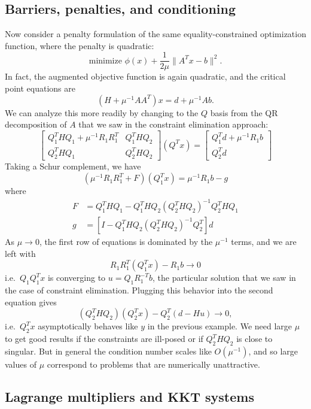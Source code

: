 \documentclass[12pt, leqno]{article} %
\begin{document}
\subsection*{Barriers, penalties, and conditioning}

Now consider a penalty formulation of the same equality-constrained
optimization function, where the penalty is quadratic:
\[
  \mbox{minimize } \phi(x) + \frac{1}{2\mu} \|A^T x-b\|^2.
\]
In fact, the augmented objective function is again quadratic, and
the critical point equations are
\[
  (H + \mu^{-1} AA^T) x = d + \mu^{-1} A b.
\]
We can analyze this more readily by changing to the $Q$ basis from
the QR decomposition of $A$ that we saw in the constraint elimination
approach:
\[
\begin{bmatrix}
  Q_1^T H Q_1 + \mu^{-1} R_1 R_1^T & Q_1^T H Q_2 \\
  Q_2^T H Q_1 & Q_2^T H Q_2
\end{bmatrix}
(Q^T x) =
\begin{bmatrix}
  Q_1^T d + \mu^{-1} R_1 b \\
  Q_2^T d
\end{bmatrix}
\]
Taking a Schur complement, we have
\[
(\mu^{-1} R_1 R_1^T + F)(Q_1^T x) = \mu^{-1} R_1 b - g
\]
where
\begin{align*}
  F &= Q_1^T H Q_1 - Q_1^T H Q_2 (Q_2^T H Q_2)^{-1} Q_2^T H Q_1 \\
  g &= [I - Q_1^T H Q_2 (Q_2^T H Q_2)^{-1} Q_2^T] d
\end{align*}
As $\mu \rightarrow 0$, the first row of equations is dominated by the
$\mu^{-1}$ terms, and we are left with
\[
  R_1 R_1^T (Q_1^T x) - R_1 b \rightarrow 0
\]
i.e.~$Q_1 Q_1^T x$ is converging to $u = Q_1 R_1^{-T} b$, the
particular solution that we saw in the case of constraint elimination.
Plugging this behavior into the second equation gives
\[
  (Q_2^T H Q_2) (Q_2^T x) - Q_2^T (d-Hu) \rightarrow 0,
\]
i.e.~$Q_2^T x$ asymptotically behaves like $y$ in the previous
example.  We need large $\mu$ to get good results if the constraints
are ill-posed or if $Q_2^T H Q_2$ is close to singular.  But in
general the condition number scales like $O(\mu^{-1})$, and so large
values of $\mu$ correspond to problems that are numerically
unattractive.

\subsection*{Lagrange multipliers and KKT systems}

\end{document}
